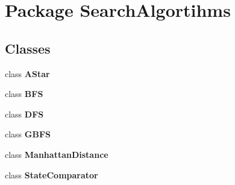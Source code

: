 \section{Package Search\+Algortihms}
\label{namespace_search_algortihms}
\subsection*{Classes}
\begin{DoxyCompactItemize}
\item 
class {\bf A\+Star}
\item 
class {\bf B\+F\+S}
\item 
class {\bf D\+F\+S}
\item 
class {\bf G\+B\+F\+S}
\item 
class {\bf Manhattan\+Distance}
\item 
class {\bf State\+Comparator}
\end{DoxyCompactItemize}
